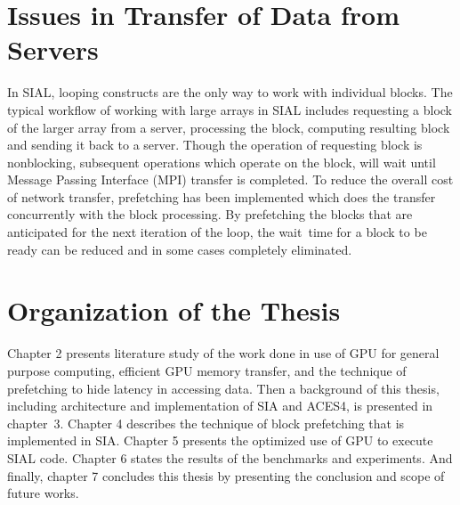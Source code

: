 \section{Issues in Transfer of Data from Servers}
In SIAL, looping constructs are the only way to work with individual blocks.
The typical workflow of working with large arrays in SIAL includes requesting a
block of the larger array from a server,
processing the block, computing resulting block and sending it back to a server. Though
the operation of requesting block is nonblocking, subsequent operations
which operate on the block, will wait until Message Passing Interface (MPI)
transfer is completed. To reduce the overall cost of network
transfer, prefetching has been implemented which does the transfer concurrently
with the block processing. By prefetching the blocks that are anticipated for
the next iteration of the loop, the wait~time for a block to be ready
can be reduced and in some cases completely eliminated.

\section{Organization of the Thesis}
Chapter 2 presents literature study of the work done in use of GPU for general purpose
computing, efficient GPU memory transfer, and the technique of prefetching to hide
latency in accessing data. Then a background of this thesis, including architecture
and implementation of SIA and ACES4, is presented in chapter~3.
Chapter 4 describes the technique of block prefetching that is implemented in SIA. Chapter 5
presents the optimized use of GPU to execute SIAL code. Chapter 6 states the
results of the benchmarks and experiments. And
finally, chapter 7 concludes this thesis by presenting the conclusion and scope
of future works.